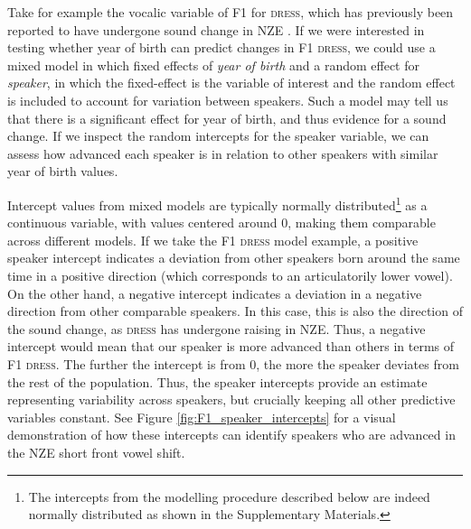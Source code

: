 \documentclass[review]{elsarticle} %
\begin{document}
Take for example the vocalic variable of F1 for \textsc{dress}, which has previously been reported to have undergone sound change in NZE \citep{maclagan2007getting, gordon2007onze, hay2015tracking}. If we were interested in testing whether year of birth can predict changes in F1 \textsc{dress}, we could use a mixed model in which fixed effects of \textit{year of birth} and a random effect for \textit{speaker}, in which the fixed-effect is the variable of interest and the random effect is included to account for variation between speakers. Such a model may tell us that there is a significant effect for year of birth, and thus evidence for a sound change. If we inspect the random intercepts for the speaker variable, we can assess how advanced each speaker is in relation to other speakers with similar year of birth values.

Intercept values from mixed models are typically normally distributed\footnote{The intercepts from the modelling procedure described below are indeed normally distributed as shown in the Supplementary Materials.} as a continuous variable, with values centered around 0, making them comparable across different models. If we take the F1 \textsc{dress} model example, a positive speaker intercept indicates a deviation from other speakers born around the same time in a positive direction (which corresponds to an articulatorily lower vowel). On the other hand, a negative intercept indicates a deviation in a negative direction from other comparable speakers. In this case, this is also the direction of the sound change, as \textsc{dress} has undergone raising in NZE. Thus, a negative intercept would mean that our speaker is more advanced than others in terms of F1 \textsc{dress}. The further the intercept is from 0, the more the speaker deviates from the rest of the population. Thus, the speaker intercepts provide an estimate representing variability across speakers, but crucially keeping all other predictive variables constant. See Figure \ref{fig:F1_speaker_intercepts} for a visual demonstration of how these intercepts can identify speakers who are advanced in the NZE short front vowel shift.

\end{document}
